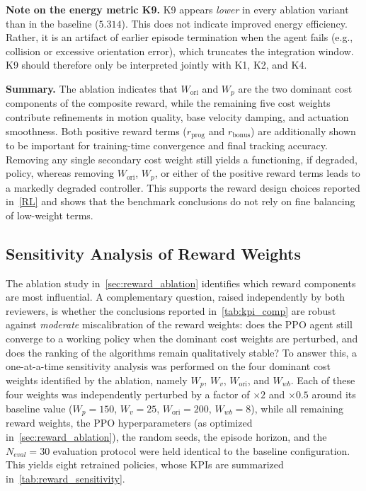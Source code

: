 \documentclass{ieeeaccess}
\begin{document}
\noindent\textbf{Note on the energy metric K9.} K9 appears \emph{lower} in every ablation variant than
in the baseline ($5.314$).
This does not indicate improved energy efficiency. Rather, it is an artifact of earlier
episode termination when the agent fails
(e.g., collision or excessive orientation error), which truncates the integration window. K9 should therefore
only be interpreted
jointly with K1, K2, and K4.

\noindent\textbf{Summary.} The ablation indicates that $W_{\mathrm{ori}}$ and $W_p$ are the two dominant cost components
of the
composite reward, while the remaining five cost weights contribute refinements in motion quality, base
velocity damping, and
actuation smoothness. Both positive reward terms ($r_{\text{prog}}$ and $r_{\text{bonus}}$) are additionally shown to be
important
for training-time convergence and final tracking accuracy. Removing any single secondary cost weight still
yields a functioning,
if degraded, policy, whereas removing $W_{\mathrm{ori}}$, $W_p$, or either of the positive reward terms
leads to a markedly
degraded controller. This supports the reward design choices reported in~\autoref{RL} and shows that the
benchmark conclusions
do not rely on fine balancing of low-weight terms.

\subsection{Sensitivity Analysis of Reward Weights}\label{sec:reward_sensitivity}
The ablation study in~\autoref{sec:reward_ablation} identifies which reward components are
most influential. A complementary question, raised independently by both reviewers, is whether the
conclusions reported in~\autoref{tab:kpi_comp} are robust against \emph{moderate} miscalibration of the reward weights:
does the PPO agent still converge to a working policy when the dominant cost
weights are perturbed, and does the
ranking of the algorithms remain qualitatively stable? To answer this, a one-at-a-time sensitivity
analysis was performed on the four dominant cost weights identified by the ablation, namely
$W_p$, $W_v$, $W_{\mathrm{ori}}$, and
$W_{wb}$. Each of these four weights was independently perturbed by a factor of $\times 2$
and $\times 0.5$ around its
baseline value ($W_p=150$, $W_v=25$, $W_{\mathrm{ori}}=200$, $W_{wb}=8$), while all remaining reward weights, the
PPO hyperparameters (as optimized in~\autoref{sec:reward_ablation}), the random seeds, the episode horizon, and the
$N_{eval}=30$ evaluation protocol were held identical to the baseline configuration. This yields eight retrained
policies, whose KPIs are summarized in~\autoref{tab:reward_sensitivity}.
\end{document}
